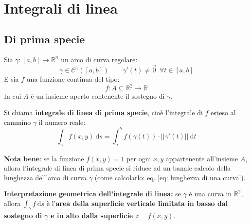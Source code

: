 \documentclass[a4paper]{article}
\newcommand{\definition}[1]{\textcolor{Red3}{\textbf{#1}}}
\begin{document}
	\newpage

	\section{Integrali di linea}

	\subsection{Di prima specie}

	\begin{boxdef}
		Sia $\gamma : \left[a,b\right] \rightarrow \mathbb{R}^{n}$ un arco di curva regolare:
		\begin{equation*}
			\gamma \in \mathcal{C}^{1}\left(\left[a,b\right]\right) \hspace{2em} \gamma'\left(t\right) \ne \overset{\rightarrow}{0} \:\:\forall t \in \left[a,b\right]
		\end{equation*}
		E sia $f$ una funzione continua del tipo:
		\begin{equation*}
			f : A \subseteq \mathbb{R}^{2} \rightarrow \mathbb{R}
		\end{equation*}
		In cui $A$ è un insieme aperto contenente il sostegno di $\gamma$.

		Si chiama \definition{integrale di linea di prima specie}, cioè l'integrale di $f$ esteso al cammino $\gamma$ il numero reale:
		\begin{equation}\label{eq: integrale di linea di prima specie}
			\displaystyle\int_{\gamma} f\left(x,y\right) \:\mathrm{d}s = \displaystyle\int_{a}^{b} f\left(\gamma\left(t\right)\right) \cdot \left|\left| \gamma'\left(t\right) \right|\right| \:\mathrm{d}t
		\end{equation}
	\end{boxdef}

	\noindent
	\textbf{Nota bene}: se la funzione $f\left(x,y\right) = 1$ per ogni $x,y$ appartenente all'insieme $A$, allora l'integrale di linea di prima specie si riduce ad un banale calcolo della lunghezza dell'arco di curva $\gamma$ (come calcolarlo: eq. \ref{eq: lunghezza di una curva}).\newline

	\noindent
	\definition{\underline{Interpretazione geometrica} dell'integrale di linea:} se $\gamma$ è una curva in $\mathbb{R}^{2}$, allora $\displaystyle\int_{\gamma} f \:\mathrm{d}s$ è l'\textbf{area della superficie verticale limitata in basso dal sostegno di $\gamma$ e in alto dalla superficie $z = f\left(x,y\right)$}.
\end{document}
